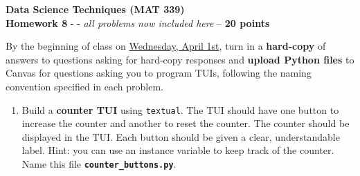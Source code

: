\documentclass[12pt]{article}
\begin{document}
	
\begin{center}
	\textbf{Data Science Techniques (MAT 339)} \\
	\textbf{Homework 8} - - \textit{all problems now included here} -- \textbf{20 points}\\
\end{center}
By the beginning of class on \underline{Wednesday, April 1st}, turn in a \textbf{hard-copy} of answers to questions asking for hard-copy responses and \textbf{upload Python files} to Canvas for questions asking you to program TUIs, following the naming convention specified in each problem. \\

\begin{enumerate}
		
	\item Build a \textbf{counter TUI} using \texttt{textual}. The TUI should have one button to increase the counter and another to reset the counter. The counter should be displayed in the TUI. Each button should be given a clear, understandable label. Hint: you can use an instance variable to keep track of the counter. Name this file \textbf{\texttt{counter\_buttons.py}}.
	

\end{enumerate}
\end{document}
